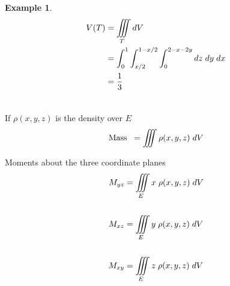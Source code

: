 \documentclass[11pt,a4paper]{article}
\theoremstyle{definition}
\newtheorem{exa}[thm]{Example}
\begin{document}
\begin{exa}
\begin{align*}
V(T) & = \iiint\limits_TdV\\
& = \int^1_0\int^{1-x/2}_{x/2} \int_0^{2-x-2y} dz\hspace{0.1cm}dy\hspace{0.1cm}dx\\
& = \frac{1}{3}\\\\
\end{align*}

If $\rho(x,y,z)$ is the density over $E$  $$\text{Mass}\hspace{0.2cm} = \iiint\rho(x,y,z)\hspace{0.1cm}dV$$

Moments about the three coordinate planes
\begin{align*}
M_{yz} & = \iiint\limits_E x\hspace{0.1cm} \rho (x,y,z)\hspace{0.1cm}dV\\\\
M_{xz} & = \iiint\limits_E y\hspace{0.1cm} \rho (x,y,z)\hspace{0.1cm}dV\\\\
M_{xy} & = \iiint\limits_E z\hspace{0.1cm} \rho (x,y,z)\hspace{0.1cm}dV\\\\
\end{align*}
\end{exa}
\end{document}
